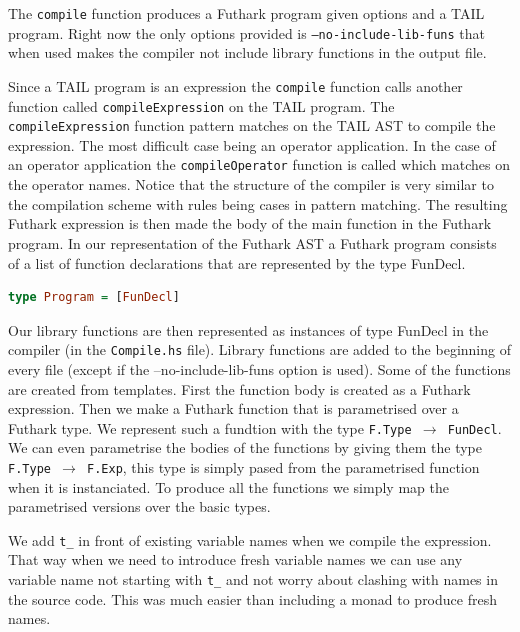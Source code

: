 \documentclass[11pt]{article}
\begin{document}
The {\tt compile} function produces a Futhark program given options and a TAIL program. 
Right now the only options provided is {\tt --no-include-lib-funs} that when used makes the compiler not include library functions in the output file. 

Since a TAIL program is an expression the {\tt compile} function calls another function called {\tt compileExpression} on the TAIL program. The {\tt compileExpression} function pattern matches on the TAIL AST to compile the expression. The most difficult case being an operator application. In the case of an operator application the {\tt compileOperator} function is called which matches on the operator names. Notice that the structure of the compiler is very similar to the compilation scheme with rules being cases in pattern matching.
The resulting Futhark expression is then made the body of the main
function in the Futhark program. 
In our representation of the Futhark AST a Futhark program consists of a list of function declarations that are represented by the type FunDecl. 

\begin{lstlisting}[language=haskell]
type Program = [FunDecl]
\end{lstlisting}

Our library functions are then represented as instances of type FunDecl in the compiler (in the {\tt Compile.hs} file).
Library functions are added to the beginning of every file (except if the --no-include-lib-funs option is used). 
Some of the functions are created from templates. First the function body is created as a Futhark expression. Then we make a Futhark function that is parametrised over a Futhark type. We represent such a fundtion with the type {\tt F.Type $\rightarrow$ FunDecl}. We can even parametrise the bodies of the functions by giving them the type {\tt F.Type $\rightarrow$ F.Exp}, this type is simply pased from the parametrised function when it is instanciated. To produce all the functions we simply map the parametrised versions over the basic types. 

We add {\tt t\_} in front of existing variable names when we compile the expression. That way when we need to introduce fresh variable names we can use any variable name not starting with {\tt t\_} and not worry about clashing with names in the source code. This was much easier than including a monad to produce fresh names. 
\end{document}
